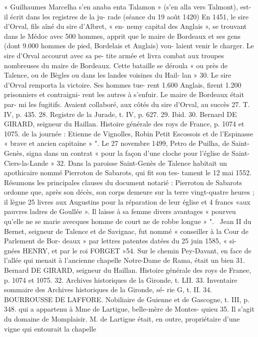 \documentclass[a4paper,11pt]{book}
\begin{document}
« Guilhaumes Marcelha s'en anaba enta Talamon » (s'en
alla vers Talmont), est-il écrit dans les registres de la ju-
rade (séance du 19 août 1420)
En 1451, le sire d'Orval, fils aîné du sire d'Albret, « en-
nemy capital des Anglais », se trouvant dans le Médoc avec
500 hommes, apprit que le maire de Bordeaux et ses gens
(dont 9.000 hommes de pied, Bordelais et Anglais) vou-
laient venir le charger. Le sire d'Orval accourut avec sa pe-
tite armée et livra combat aux troupes nombreuses du
maire de Bordeaux. Cette bataille se déroula « ou près de
Talence, ou de Bègles ou dans les landes voisines du Hail-
lan » 30.
Le sire d'Orval remporta la victoire. Ses hommes tue-
rent 1.600 Anglais, firent 1.200 prisonniers et contraigni-
rent les autres à s'enfuir. Le maire de Bordeaux était par-
mi les fugitifs.
Avaient collaboré, aux côtés du sire d'Orval, au succès
27. T. IV, p. 435.
28. Registre de la Jurade, t. IV, p. 627.
29. Ibid.
30. Bernard DE GIRARD, seigneur du Haillan. Histoire générale des
roys de France, p. 1074 et 1075.
de la journée : Etienne de Vignolles, Robin Petit Escossois
et de l'Espinasse « brave et ancien capitaine » ".
Le 27 novembre 1499, Petro de Puilha, de Saint-Genès,
signa dans un contrat « pour la façon d'une cloche pour
l'église de Saint-Ciers-la-Lande » 32.
Dans la paroisse Saint-Genès de Talence habitait un
apothicaire nommé Pierroton de Sabarots, qui fit son tes-
tament le 12 mai 1552. Résumons les principales clauses
du document notarié :
Pierroton de Sabarots ordonne que, après son décès,
son corps demeure sur la terre vingt-quatre heures ; il
lègue 25 livres aux Augustins pour la réparation de leur
église et 4 francs «aux pauvres ladres de Goullée ». Il
laisse à sa femme divers avantages « pourveu qu'elle ne se
marie avecques homme de court ne de robbe longue » ".
\
Jean II du Bernet, seigneur de Talence et de Savignac,
fut nommé « conseiller à la Cour de Parlement de Bor-
deaux » par lettres patentes datées du 25 juin 1585, « si-
gnées HENRY, et par le roi FORGET »54.
Sur le chemin Pey-Davant, en face de l'allée qui menait
à l'ancienne chapelle Notre-Dame de Rama, était un bien
31. Bernard DE GIRARD, seigneur du Haillan. Histoire générale des
roys de Franee, p. 1074 et 1075.
32. Archives historiques de la Gironde, t. LII.
33. Inventaire sommaire des Archives historiques de la Gironde, sé-
rie G, t. II.
34. BOURROUSSE DE LAFFORE. Nobiliaire de Guienne et de Gascogne,
t. III, p. 348.
qui a appartenu à Mme de Lartigue, belle-mère de Montes-
quieu 35.
Il s'agit du domaine de Momplaisir. M. de Lartigue était,
en outre, propriétaire d'une vigne qui entourait la chapelle
\end{document}
